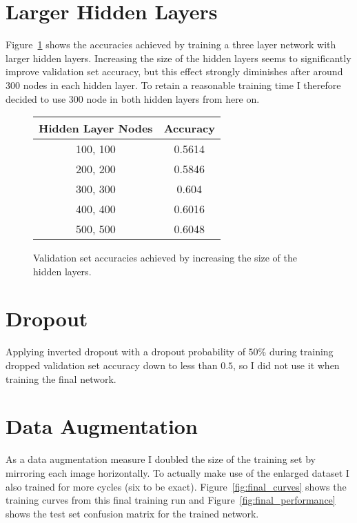 \documentclass{article}
\begin{document}
\section{Larger Hidden Layers}

Figure~\ref{fig:width} shows the accuracies achieved by training a three layer
network with larger hidden layers. Increasing the size of the hidden layers
seems to significantly improve validation set accuracy, but this effect
strongly diminishes after around $300$ nodes in each hidden layer. To retain
a reasonable training time I therefore decided to use $300$ node in both hidden
layers from here on.

\begin{figure}[H]
  \centering
    \footnotesize
    \begin{tabular}{|c|c|}
    \hline
    Hidden Layer Nodes & Accuracy \\
    \hline
    100, 100           & 0.5614   \\
    \hline
    200, 200           & 0.5846   \\
    \hline
    300, 300           & 0.604    \\
    \hline
    400, 400           & 0.6016   \\
    \hline
    500, 500           & 0.6048   \\
    \hline
    \end{tabular}
  \caption{Validation set accuracies achieved by increasing the size of the
           hidden layers.}
  \label{fig:width}
\end{figure}

\section{Dropout}

Applying inverted dropout with a dropout probability of $50\%$ during training
dropped validation set accuracy down to less than $0.5$, so I did not use
it when training the final network.

\section{Data Augmentation}

As a data augmentation measure I doubled the size of the training set by
mirroring each image horizontally. To actually make use of the enlarged dataset
I also trained for more cycles (six to be exact).
Figure~\ref{fig:final_curves} shows the training curves from this final
training run and Figure~\ref{fig:final_performance} shows the test set
confusion matrix for the trained network.
\end{document}
